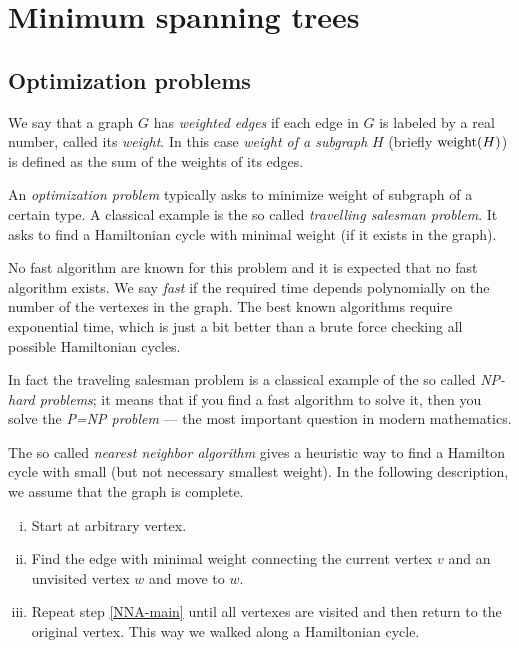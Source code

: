 \chapter{Minimum spanning trees}


\section*{Optimization problems}

We say that a graph $G$ has \emph{weighted edges} if each edge in $G$ is labeled by a real number, called its \emph{weight}.
In this case \emph{weight of a subgraph} $H$ (briefly $\mathop{\rm weight}\nolimits(H)$) is defined as the sum of the weights of its edges.

An {}\emph{optimization problem} typically asks to minimize weight of subgraph of a certain type.
A classical example is the so called \emph{travelling salesman problem}.
It asks to find a Hamiltonian cycle with minimal weight (if it exists in the graph).

No fast algorithm are known for this problem and it is expected that no fast algorithm exists.
We say {}\emph{fast} if the required time depends polynomially on the number of the vertexes in the graph.
The best known algorithms require exponential time, which is just a bit better than a brute force checking all possible Hamiltonian cycles.

In fact the traveling salesman problem is a classical example of the so called {}\emph{NP-hard problems}; it means that if you find a fast algorithm to solve it, then you solve the \emph{P=NP problem} --- the most important question in modern mathematics.

The so called \emph{nearest neighbor algorithm} gives a heuristic way to find a Hamilton cycle with small (but not necessary smallest weight).
In the following description, we assume that the graph is complete.
\begin{enumerate}[(i)]
\item Start at arbitrary vertex.
\item\label{NNA-main} Find the edge with minimal weight connecting the current vertex $v$ and an unvisited vertex $w$ and move to $w$.
\item Repeat step \ref{NNA-main} until all vertexes are visited and then return to the original vertex.
This way we walked along a Hamiltonian cycle.
\end{enumerate}

